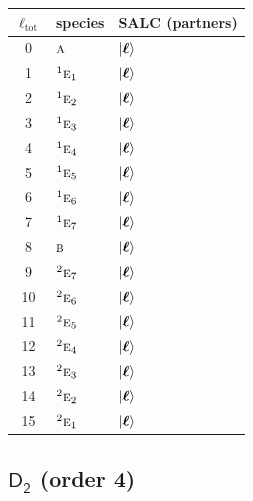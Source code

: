 \documentclass[11pt]{article}
\newcommand{\grp}[1]{\mathsf{#1}}
\newcommand{\irr}[1]{\text{\normalfont\scshape #1}}
\newcommand{\conjpair}[1]{{}^{#1}}
\begin{document}
\begin{longtable}{c l l}\hline $\ell_{\mathrm{tot}}$ & species & SALC (partners)\\ \hline\endhead

0 & $\irr{a}$ & $\ket{\boldsymbol\ell}$\\

1 & $\conjpair{1}\irr{e}_{1}$ & $\ket{\boldsymbol\ell}$\\

2 & $\conjpair{1}\irr{e}_{2}$ & $\ket{\boldsymbol\ell}$\\

3 & $\conjpair{1}\irr{e}_{3}$ & $\ket{\boldsymbol\ell}$\\

4 & $\conjpair{1}\irr{e}_{4}$ & $\ket{\boldsymbol\ell}$\\

5 & $\conjpair{1}\irr{e}_{5}$ & $\ket{\boldsymbol\ell}$\\

6 & $\conjpair{1}\irr{e}_{6}$ & $\ket{\boldsymbol\ell}$\\

7 & $\conjpair{1}\irr{e}_{7}$ & $\ket{\boldsymbol\ell}$\\

8 & $\irr{b}$ & $\ket{\boldsymbol\ell}$\\

9 & $\conjpair{2}\irr{e}_{7}$ & $\ket{\boldsymbol\ell}$\\

10 & $\conjpair{2}\irr{e}_{6}$ & $\ket{\boldsymbol\ell}$\\

11 & $\conjpair{2}\irr{e}_{5}$ & $\ket{\boldsymbol\ell}$\\

12 & $\conjpair{2}\irr{e}_{4}$ & $\ket{\boldsymbol\ell}$\\

13 & $\conjpair{2}\irr{e}_{3}$ & $\ket{\boldsymbol\ell}$\\

14 & $\conjpair{2}\irr{e}_{2}$ & $\ket{\boldsymbol\ell}$\\

15 & $\conjpair{2}\irr{e}_{1}$ & $\ket{\boldsymbol\ell}$\\

\hline\end{longtable}

\subsection*{$\grp{D_{2}}$ \quad (order 4)}
\end{document}
